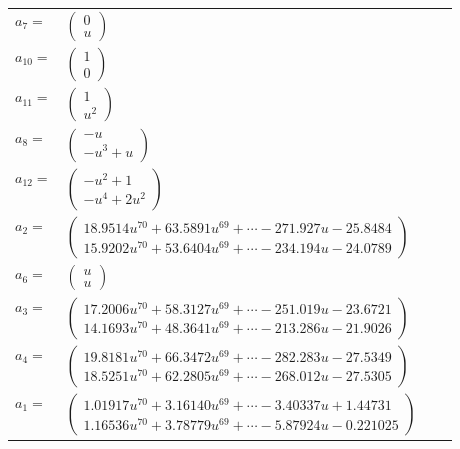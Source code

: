 \documentclass[1p]{elsarticle_modified}
\theoremstyle{definition}
\begin{document}
\begin{tabular}{m{7pt} m{180pt} m{7pt} m{180pt} }
\flushright $a_{7}=$&$\begin{pmatrix}0\\u\end{pmatrix}$ \\
\flushright $a_{10}=$&$\begin{pmatrix}1\\0\end{pmatrix}$ \\
\flushright $a_{11}=$&$\begin{pmatrix}1\\u^2\end{pmatrix}$ \\
\flushright $a_{8}=$&$\begin{pmatrix}- u\\- u^3+u\end{pmatrix}$ \\
\flushright $a_{12}=$&$\begin{pmatrix}- u^2+1\\- u^4+2 u^2\end{pmatrix}$ \\
\flushright $a_{2}=$&$\begin{pmatrix}18.9514 u^{70}+63.5891 u^{69}+\cdots-271.927 u-25.8484\\15.9202 u^{70}+53.6404 u^{69}+\cdots-234.194 u-24.0789\end{pmatrix}$ \\
\flushright $a_{6}=$&$\begin{pmatrix}u\\u\end{pmatrix}$ \\
\flushright $a_{3}=$&$\begin{pmatrix}17.2006 u^{70}+58.3127 u^{69}+\cdots-251.019 u-23.6721\\14.1693 u^{70}+48.3641 u^{69}+\cdots-213.286 u-21.9026\end{pmatrix}$ \\
\flushright $a_{4}=$&$\begin{pmatrix}19.8181 u^{70}+66.3472 u^{69}+\cdots-282.283 u-27.5349\\18.5251 u^{70}+62.2805 u^{69}+\cdots-268.012 u-27.5305\end{pmatrix}$ \\
\flushright $a_{1}=$&$\begin{pmatrix}1.01917 u^{70}+3.16140 u^{69}+\cdots-3.40337 u+1.44731\\1.16536 u^{70}+3.78779 u^{69}+\cdots-5.87924 u-0.221025\end{pmatrix}$ \\

\end{tabular}
\end{document}
